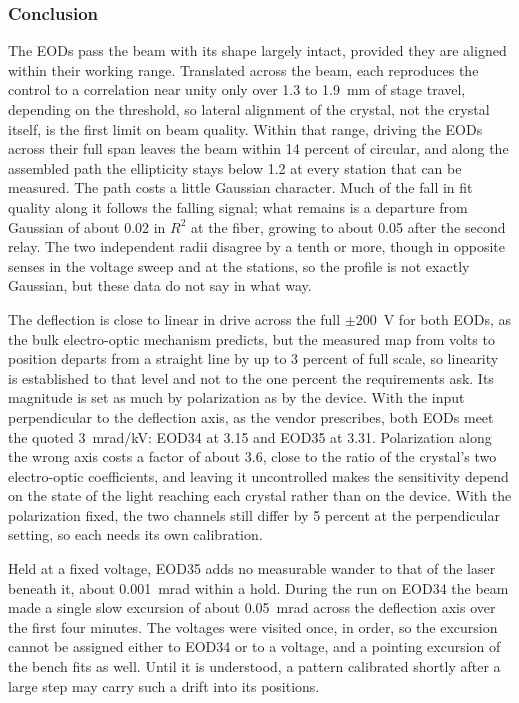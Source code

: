 \documentclass{article}
\begin{document}
\FloatBarrier %

\subsubsection{Conclusion}

The EODs pass the beam with its shape largely intact, provided they are aligned within
their working range. Translated across the beam, each reproduces the control to a correlation
near unity only over 1.3 to 1.9~mm of stage travel, depending on the threshold, so lateral
alignment of the crystal, not the crystal itself, is the first limit on beam quality. Within that
range, driving the EODs across their full span leaves the beam within 14 percent of circular, and
along the assembled path the ellipticity stays below 1.2 at every station that can be measured.
The path costs a little Gaussian character. Much of the fall in fit quality along it follows the
falling signal; what remains is a departure from Gaussian of about 0.02 in $R^2$ at the fiber,
growing to about 0.05 after the second relay. The two independent radii disagree by a tenth or
more, though in opposite senses in the voltage sweep and at the stations, so the profile is not
exactly Gaussian, but these data do not say in what way.

The deflection is close to linear in drive across the full $\pm200$~V for both EODs, as the bulk
electro-optic mechanism predicts, but the measured map from volts to position departs from a
straight line by up to 3 percent of full scale, so linearity is established to that level and not
to the one percent the requirements ask. Its
magnitude is set as much by polarization as by the device. With the input
perpendicular to the deflection axis, as the vendor prescribes, both EODs meet the quoted
3~mrad/kV: EOD34 at 3.15 and EOD35 at 3.31.
Polarization along the wrong axis costs a factor of about 3.6, close to the ratio of the
crystal's two electro-optic coefficients, and leaving it uncontrolled makes the sensitivity
depend on the state of the light reaching each crystal rather than on the device. With the
polarization fixed, the two channels still differ by 5 percent at the perpendicular setting, so
each needs its own calibration.

Held at a fixed voltage, EOD35 adds no measurable wander to that of the laser beneath it, about
0.001~mrad within a hold. During the run on EOD34 the beam made a single slow excursion of about
0.05~mrad across the deflection axis over the first four minutes. The voltages were visited once,
in order, so the excursion cannot be assigned either to EOD34 or to a voltage, and a pointing
excursion of the bench fits as well. Until it is understood, a pattern calibrated shortly after a
large step may carry such a drift into its positions.
\end{document}
